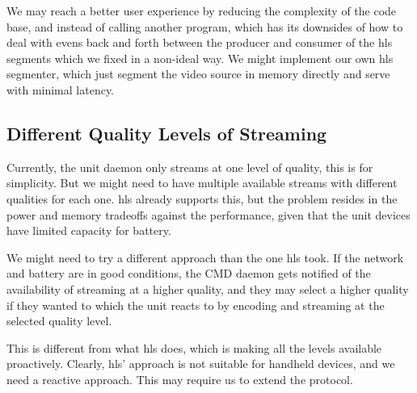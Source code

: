 We may reach a better user experience by reducing the complexity of the code base, and instead of calling another program, which has its downsides of how to deal with evens back and forth between the producer and consumer of the \acrfull{hls} segments which we fixed in a non-ideal way.
We might implement our own \acrshort{hls} segmenter, which just segment the video source in memory directly and serve with minimal latency.

\subsection{Different Quality Levels of Streaming}
Currently, the unit daemon only streams at one level of quality, this is for simplicity.
But we might need to have multiple available streams with different qualities for each one.
\acrshort{hls} already supports this, but the problem resides in the power and memory tradeoffs against the performance, given that the unit devices have limited capacity for battery.

We might need to try a different approach than the one \acrshort{hls} took.
If the network and battery are in good conditions, the CMD daemon gets notified of the availability of streaming at a higher quality, and they may select a higher quality if they wanted to which the unit reacts to by encoding and streaming at the selected quality level.

This is different from what \acrshort{hls} does, which is making all the levels available proactively.
Clearly, \acrshort{hls}' approach is not suitable for handheld devices, and we need a reactive approach.
This may require us to extend the protocol.

\newpage

\printbibliography
